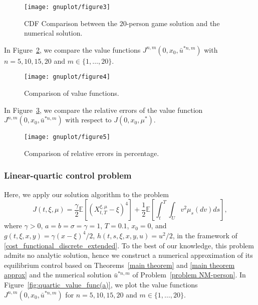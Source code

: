 \documentclass[12pt]{article}
\theoremstyle{named}
\numberwithin{equation}{section}
\begin{document}
\begin{figure}[H]
  \centering
  \texttt{[image: gnuplot/figure3]}
  \caption{CDF Comparison between
    the $20$-person game solution
    and the numerical solution.}
\label{fig:quadratic_cdf_diff_time}
\end{figure}

\noindent
 In Figure~\ref{fig:quadratic_value_func(a)},
 we compare the value functions $J^{n,m}(0, x_0, \bar{u}^{*n,m})$
 with
${n} = 5, 10, 15, 20$ and ${m} \in \{1, \ldots , 20\}$.

\begin{figure}[H]
\centering
   \texttt{[image: gnuplot/figure4]}
   \caption{Comparison of value functions.}
   \label{fig:quadratic_value_func(a)}
\end{figure}

\noindent
In Figure~\ref{fig:quadratic_value_func(b)}, we compare the
relative errors of the value function $J^{n,m}(0, x_0, \bar{u}^{*n,m})$
with respect to $J(0, x_0, \mu^*)$.

\begin{figure}[H]
  \centering
  \texttt{[image: gnuplot/figure5]}
   \caption{Comparison of relative errors in percentage.}
   \label{fig:quadratic_value_func(b)}
\end{figure}

\subsubsection{Linear-quartic control problem}
Here, we apply our solution algorithm to the problem
\begin{equation}
  \nonumber
  J(t,\xi,\mu) =
    \frac{\gamma}{2} \mathbb{E} [(X^{\xi,\mu}_{t,T} - \xi)^4]
    + \frac{1}{2} \mathbb{E} \left[ \int_t^T \int_U v^2 \mu_s(dv) ds\right] ,
\end{equation}
where $\gamma >0$, $a=b=\sigma=\gamma=1$, $T=0.1$, $x_0=0$,
and
 $g(t,\xi ,x,y) = \gamma (x-\xi)^4/2$,
 $h(t,s,\xi ,x,y,u) = u^2/2$,
 in the framework of \eqref{cost_functional_discrete_extended}.
To the best of our knowledge, this problem admits
no analytic solution, hence we construct a numerical approximation of
its equilibrium control
based on Theorems~\ref{main theorem} and \ref{main theorem approx}
and the numerical solution $\bar{u}^{*{n},{m}}$ of Problem~\eqref{problem NM-person}.
 In Figure~\ref{fig:quartic_value_func(a)},
  we plot the value functions $J^{n,m}(0, x_0, \bar{u}^{*n,m})$
 for ${n} = 5, 10, 15, 20$ and ${m} \in \{ 1, \ldots , 20 \}$.
\end{document}
